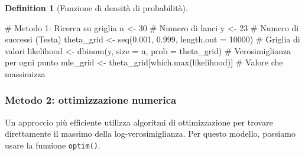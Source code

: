 \documentclass[
  letterpaper,
  DIV=11,
  numbers=noendperiod,
  oneside]{scrreprt}
\newenvironment{Shaded}{\begin{snugshade}}{\end{snugshade}}
\newcommand{\AttributeTok}[1]{\textcolor[rgb]{0.40,0.45,0.13}{#1}}
\newcommand{\CommentTok}[1]{\textcolor[rgb]{0.37,0.37,0.37}{#1}}
\newcommand{\ControlFlowTok}[1]{\textcolor[rgb]{0.00,0.23,0.31}{\textbf{#1}}}
\newcommand{\DecValTok}[1]{\textcolor[rgb]{0.68,0.00,0.00}{#1}}
\newcommand{\FloatTok}[1]{\textcolor[rgb]{0.68,0.00,0.00}{#1}}
\newcommand{\FunctionTok}[1]{\textcolor[rgb]{0.28,0.35,0.67}{#1}}
\newcommand{\NormalTok}[1]{\textcolor[rgb]{0.00,0.23,0.31}{#1}}
\newcommand{\OtherTok}[1]{\textcolor[rgb]{0.00,0.23,0.31}{#1}}
\newcommand{\SpecialCharTok}[1]{\textcolor[rgb]{0.37,0.37,0.37}{#1}}
\newcommand{\StringTok}[1]{\textcolor[rgb]{0.13,0.47,0.30}{#1}}
\theoremstyle{definition}
\theoremstyle{plain}
\theoremstyle{definition}
\newtheorem{definition}{Definition}[chapter]
\theoremstyle{remark}
\begin{document}
\begin{definition}[Funzione di densità di
probabilità]
\begin{Shaded}
\begin{Highlighting}[]
\CommentTok{\# Metodo 1: Ricerca su griglia}
\NormalTok{n }\OtherTok{\textless{}{-}} \DecValTok{30}          \CommentTok{\# Numero di lanci}
\NormalTok{y }\OtherTok{\textless{}{-}} \DecValTok{23}          \CommentTok{\# Numero di successi (Testa)}
\NormalTok{theta\_grid }\OtherTok{\textless{}{-}} \FunctionTok{seq}\NormalTok{(}\FloatTok{0.001}\NormalTok{, }\FloatTok{0.999}\NormalTok{, }\AttributeTok{length.out =} \DecValTok{10000}\NormalTok{)  }\CommentTok{\# Griglia di valori}
\NormalTok{likelihood }\OtherTok{\textless{}{-}} \FunctionTok{dbinom}\NormalTok{(y, }\AttributeTok{size =}\NormalTok{ n, }\AttributeTok{prob =}\NormalTok{ theta\_grid) }\CommentTok{\# Verosimiglianza per ogni punto}
\NormalTok{mle\_grid }\OtherTok{\textless{}{-}}\NormalTok{ theta\_grid[}\FunctionTok{which.max}\NormalTok{(likelihood)]        }\CommentTok{\# Valore che massimizza}
\end{Highlighting}
\end{Shaded}

\subsubsection{Metodo 2: ottimizzazione
numerica}\label{metodo-2-ottimizzazione-numerica}

Un approccio più efficiente utilizza algoritmi di ottimizzazione per
trovare direttamente il massimo della log-verosimiglianza. Per questo
modello, possiamo usare la funzione \texttt{optim()}.

\begin{Shaded}
\end{Shaded}


\end{definition}
\end{document}
